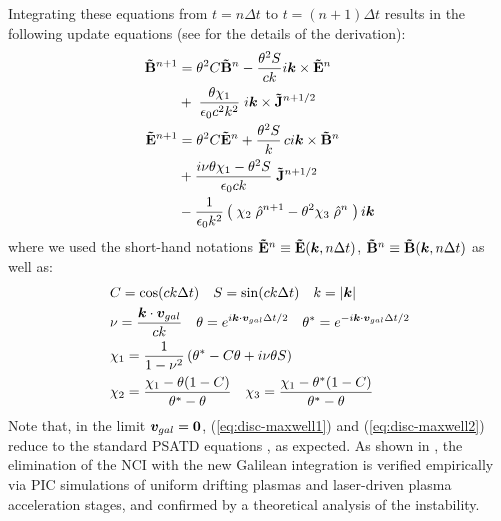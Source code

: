 \documentclass[]{report}
\begin{document}
Integrating these equations from $t=n\Delta
t$ to $t=(n+1)\Delta t$ results in the following update equations (see
\cite{LeheARXIV2016} for the details of the derivation):
%
\begin{subequations}
\begin{align}
%
\fb^{n+1} &= \theta^2 C \fb^n
 -\frac{\theta^2 S}{ck}i\vec{k}\times \fe^n \nonumber \\
& + \;\frac{\theta \chi_1}{\epsilon_0c^2k^2}\;i\vec{k} \times
                     \fj^{n+1/2} \label{eq:disc-maxwell1}\\
%
\fe^{n+1} &=  \theta^2 C  \fe^n
 +\frac{\theta^2 S}{k} \,c i\vec{k}\times \fb^n \nonumber \\
& +\frac{i\nu \theta \chi_1 - \theta^2S}{\epsilon_0 ck} \; \fj^{n+1/2}\nonumber \\
& - \frac{1}{\epsilon_0k^2}\left(\; \chi_2\;\mc{\rho}^{n+1} -
  \theta^2\chi_3\;\mc{\rho}^{n} \;\right) i\vec{k} \label{eq:disc-maxwell2}
%
\end{align}
\end{subequations}
%
where we used the short-hand notations $\fe^n \equiv
%
\fe(\vec{k}, n\Delta t)$, $\mathbf{\tilde{B}}^n \equiv
\mathbf{\tilde{B}}(\boldsymbol{k}, n\Delta t)$ as well as:
\begin{subequations}
\begin{align}
&C = \cos(ck\Delta t) \quad S = \sin(ck\Delta t) \quad k
= |\boldsymbol{k}| \label{eq:def-C-S}\\&
\nu = \frac{\boldsymbol{k}\cdot\boldsymbol{v}_{gal}}{ck} \quad \theta =
  e^{i\boldsymbol{k}\cdot\boldsymbol{v}_{gal}\Delta t/2} \quad \theta^* =
  e^{-i\boldsymbol{k}\cdot\boldsymbol{v}_{gal}\Delta t/2} \label{eq:def-nu-theta}\\&
\chi_1 =  \frac{1}{1 -\nu^2} \left( \theta^* -  C \theta + i
  \nu \theta S \right) \label{eq:def-chi1}\\&
\chi_2 = \frac{\chi_1 - \theta(1-C)}{\theta^*-\theta} \quad
\chi_3 = \frac{\chi_1-\theta^*(1-C)}{\theta^*-\theta} \label{eq:def-chi23}
\end{align}
\end{subequations}
Note that, in the limit $\boldsymbol{v}_{gal}=\boldsymbol{0}$,
(\ref{eq:disc-maxwell1}) and (\ref{eq:disc-maxwell2}) reduce to the standard PSATD
equations \cite{HaberICNSP73}, as expected. 
As shown in \cite{KirchenARXIV2016,LeheARXIV2016}, 
the elimination of the NCI with the new Galilean integration is verified empirically via PIC simulations of uniform drifting plasmas and laser-driven plasma acceleration stages, and confirmed by a theoretical analysis of the instability.

\end{document}
